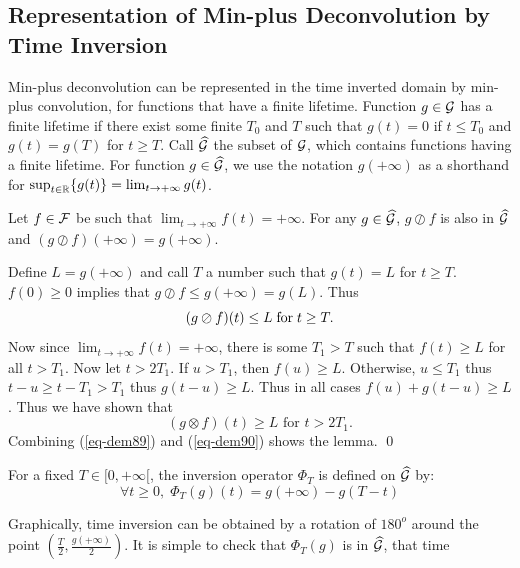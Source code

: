 \subsection{Representation of Min-plus Deconvolution by Time Inversion}
Min-plus deconvolution can be represented in the time inverted domain by min-plus convolution,
for functions that have a finite lifetime. Function $g \in \mathcal G$ has
a finite lifetime if there exist some
finite $T_{0}$ and $T$ such that $g(t)=0$ if $t \leq T_{0}$ and
$g(t)=g(T)$ for $t\geq T$.
Call $\widehat{\mathcal G}$ the subset of $\mathcal G$, which contains functions
having a finite lifetime.
For function $g \in \widehat{\mathcal G}$, we use the notation
$g(+\infty)$ as a shorthand for $\sup_{t \in \mathbb{R}} \{ g(t) \} =
\lim_{t \rightarrow +\infty} g(t)$.
\begin{lemma}
    Let $f \in \mathcal F$ be such that $\lim_{t \rightarrow + \infty}f(t) = +\infty$.
    For any $g \in \widehat{\mathcal G}$, $g \oslash f$ is also in $\widehat{\mathcal G}$ and $(g \oslash f) (+\infty)
    = g(+\infty)$.
\end{lemma}
\pr
Define $L=g(+\infty)$ and call $T$ a number such that $g(t)=L$ for
$t\geq T$. $f(0) \geq 0$ implies that $g \oslash f \leq g(+\infty) = g(L)$.
Thus
\begin{equation}\mylabel{eq-dem89}
  (g \oslash f)(t) \leq L \mf t\geq T.
\end{equation}
Now since $\lim_{t \rightarrow + \infty}f(t) = +\infty$, there is
some $T_{1}>T$ such that $f(t) \geq L$ for all $t > T_{1}$. Now
let $t>2T_{1}$. If $u > T_{1}$, then  $f(u) \geq L$. Otherwise, $u
\leq T_{1}$ thus $t-u \geq t-T_{1} >T_{1}$ thus $g(t-u)\geq L$.
Thus in all cases $f(u) + g(t-u) \geq L$. Thus we have shown that
    \begin{equation}
        (g \otimes f)(t) \geq L \textrm{ for } t > 2T_{1}.
        \label{eq-dem90}
    \end{equation}
Combining (\ref{eq-dem89}) and (\ref{eq-dem90}) shows the lemma.
\qed
\begin{definition}
    For a fixed $T \in [0, +\infty[$, the inversion operator $\Phi_{T}$
    is defined on $\widehat{\mathcal G}$ by:
    $$
   \forall t\geq 0,\;  \Phi_{T}(g)(t) = g( +\infty) -g(T-t)
    $$
\end{definition}
Graphically, time inversion can be obtained by a rotation of
$180^{o}$ around the point $(\frac{T}{2},\frac{g( +\infty)}{2})$.
It is simple to check that $\Phi_{T}(g)$ is in $\widehat{\mathcal G}$, that time
